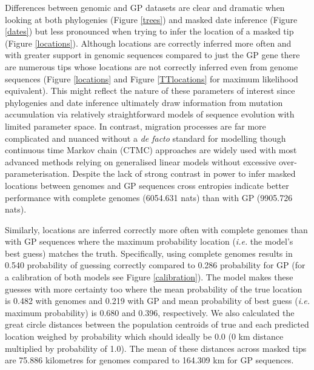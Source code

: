 \documentclass{bmcart}
\begin{document}
Differences between genomic and GP datasets are clear and dramatic when looking at both phylogenies (Figure \ref{trees}) and masked date inference (Figure \ref{dates}) but less pronounced when trying to infer the location of a masked tip (Figure \ref{locations}).
Although locations are correctly inferred more often and with greater support in genomic sequences compared to just the GP gene there are numerous tips whose locations are not correctly inferred even from genome sequences (Figure \ref{locations} and Figure \ref{TTlocations} for maximum likelihood equivalent).
This might reflect the nature of these parameters of interest since phylogenies and date inference ultimately draw information from mutation accumulation via relatively straightforward models of sequence evolution with limited parameter space.
In contrast, migration processes are far more complicated and nuanced without a \textit{de facto} standard for modelling though continuous time Markov chain (CTMC) approaches are widely used with most advanced methods relying on generalised linear models without excessive over-parameterisation.
Despite the lack of strong contrast in power to infer masked locations between genomes and GP sequences cross entropies indicate better performance with complete genomes (6054.631 nats) than with GP (9905.726 nats).

Similarly, locations are inferred correctly more often with complete genomes than with GP sequences where the maximum probability location (\textit{i.e.} the model's best guess) matches the truth.
Specifically, using complete genomes results in 0.540 probability of guessing correctly compared to 0.286 probability for GP (for a calibration of both models see Figure \ref{calibration}).
The model makes these guesses with more certainty too where the mean probability of the true location is 0.482 with genomes and 0.219 with GP and mean probability of best guess (\textit{i.e.} maximum probability) is 0.680 and 0.396, respectively.
We also calculated the great circle distances between the population centroids of true and each predicted location weighed by probability which should ideally be 0.0 (0 km distance multiplied by probability of 1.0).
The mean of these distances across masked tips are 75.886 kilometres for genomes compared to 164.309 km for GP sequences.
\end{document}
